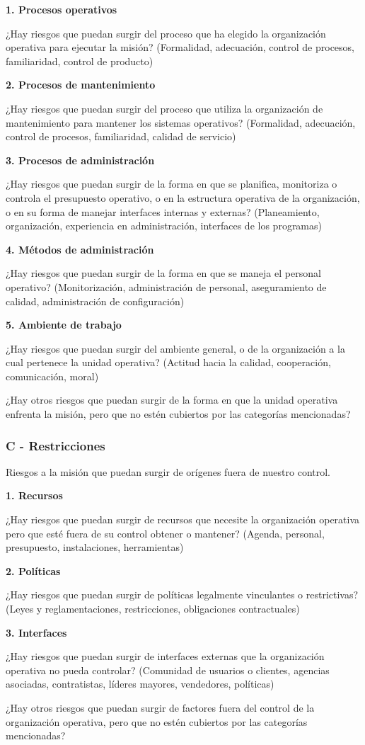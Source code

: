 \textbf{1. Procesos operativos}

¿Hay riesgos que puedan surgir del proceso que ha elegido la organización operativa para ejecutar la misión? (Formalidad, adecuación, control de procesos, familiaridad, control de producto)

\textbf{2. Procesos de mantenimiento}

¿Hay riesgos que puedan surgir del proceso que utiliza la organización de mantenimiento para mantener los sistemas operativos? (Formalidad, adecuación, control de procesos, familiaridad, calidad de servicio)

\textbf{3. Procesos de administración}

¿Hay riesgos que puedan surgir de la forma en que se planifica, monitoriza o controla el presupuesto operativo, o en la estructura operativa de la organización, o en su forma de manejar interfaces internas y externas? (Planeamiento, organización, experiencia en administración, interfaces de los programas)

\textbf{4. Métodos de administración}

¿Hay riesgos que puedan surgir de la forma en que se maneja el personal operativo? (Monitorización, administración de personal, aseguramiento de calidad, administración de configuración)

\textbf{5. Ambiente de trabajo}

¿Hay riesgos que puedan surgir del ambiente general, o de la organización a la cual pertenece la unidad operativa? (Actitud hacia la calidad, cooperación, comunicación, moral)

¿Hay otros riesgos que puedan surgir de la forma en que la unidad operativa enfrenta la misión, pero que no estén cubiertos por las categorías mencionadas?

\subsubsection{C - Restricciones}
Riesgos a la misión que puedan surgir de orígenes fuera de nuestro control.

\textbf{1. Recursos}

¿Hay riesgos que puedan surgir de recursos que necesite la organización operativa pero que esté fuera de su control obtener o mantener? (Agenda, personal, presupuesto, instalaciones, herramientas)

\textbf{2. Políticas}

¿Hay riesgos que puedan surgir de políticas legalmente vinculantes o restrictivas? (Leyes y reglamentaciones, restricciones, obligaciones contractuales)

\textbf{3. Interfaces}

¿Hay riesgos que puedan surgir de interfaces externas que la organización operativa no pueda controlar? (Comunidad de usuarios o clientes, agencias asociadas, contratistas, líderes mayores, vendedores, políticas)

¿Hay otros riesgos que puedan surgir de factores fuera del control de la organización operativa, pero que no estén cubiertos por las categorías mencionadas?